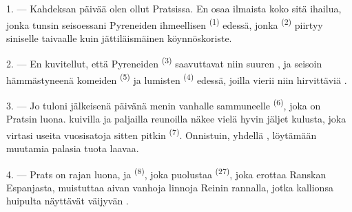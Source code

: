 %

\VUsaut{4.0mm}
\VUsaut{3.0mm}

\VUsaut{3.0mm}

\VUsaut{3.0mm}

1. --- Kahdeksan päivää olen ollut Pratsissa. En osaa ilmaista koko sitä
ihailua, jonka tunsin seisoessani Pyreneiden ihmeellisen 
\textsuperscript{(1)} edessä, jonka  \textsuperscript{(2)}
piirtyy siniselle taivaalle kuin jättiläismäinen köynnöskoriste.

2. --- En kuvitellut, että Pyreneiden  \textsuperscript{(3)}
saavuttavat niin suuren , ja seisoin hämmästyneenä komeiden
 \textsuperscript{(5)} ja lumisten 
\textsuperscript{(4)} edessä, joilla vierii niin hirvittäviä
.

\VUsaut{3.0mm}
\VUsaut{3.0mm}

3. --- Jo tuloni jälkeisenä päivänä menin vanhalle sammuneelle
 \textsuperscript{(6)}, joka on Pratsin luona.
 kuivilla ja paljailla reunoilla näkee vielä hyvin jäljet
 kulusta, joka virtasi useita vuosisatoja sitten pitkin
 \textsuperscript{(7)}. Onnistuin, yhdellä
, löytämään muutamia palasia tuota laavaa.

4. --- Prats on rajan luona, ja  \textsuperscript{(8)}, joka
puolustaa  \textsuperscript{(27)}, joka erottaa Ranskan
Espanjasta, muistuttaa aivan vanhoja linnoja Reinin rannalla, jotka kallionsa
huipulta näyttävät väijyvän .

